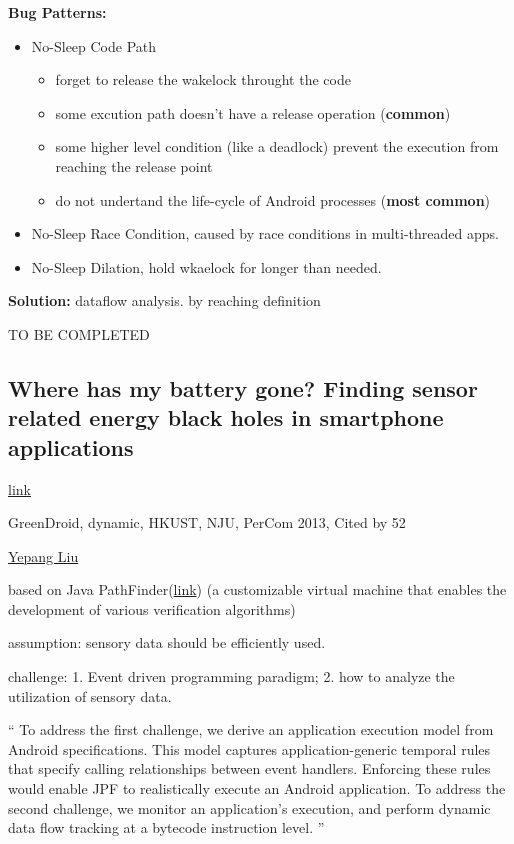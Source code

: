 \textbf{Bug Patterns:}
\begin{itemize}
\item No-Sleep Code Path
  \begin{itemize}
  \item forget to release the wakelock throught the code
  \item some excution path doesn't have a release operation (\textbf{common})
  \item some higher level condition (like a deadlock) prevent the execution from
    reaching the release point
  \item do not undertand the life-cycle of Android processes (\textbf{most
      common})
  \end{itemize}
\item No-Sleep Race Condition, caused by race conditions in multi-threaded apps.
\item No-Sleep Dilation, hold wkaelock for longer than needed.
\end{itemize}

\textbf{Solution:
}dataflow analysis. by reaching definition 

TO BE COMPLETED


\subsection{Where has my battery gone? Finding sensor related energy black holes in
  smartphone applications}

\href{http://ieeexplore.ieee.org/abstract/document/6526708/}{link}

GreenDroid, dynamic, HKUST, NJU, PerCom 2013, Cited by 52

\href{http://www.cse.ust.hk/~andrewust/}{Yepang Liu}

based on Java
PathFinder(\href{http://babelfish.arc.nasa.gov/trac/jpf/wiki}{link})
(a customizable virtual machine that enables the development of various
verification algorithms)

assumption: sensory data should be efficiently used.

challenge: 1. Event driven programming paradigm; 2. how to analyze the
utilization of sensory data.

`` To address the first challenge, we derive an application execution model from
Android specifications. This model captures application-generic temporal rules
that specify calling relationships between event handlers. Enforcing these rules
would enable JPF to realistically execute an Android application. To address the
second challenge, we monitor an application’s execution, and perform dynamic
data flow tracking at a bytecode instruction level. ''

